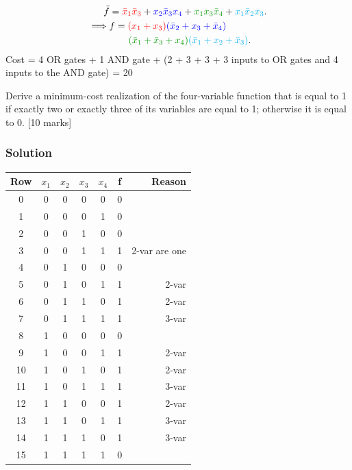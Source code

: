 \\
\begin{align}
  \bar{f} &= { \cred \bx_1 \bx_3 }  +  { \cb  x_2 \bx_3 x_4 }+  {\cg x_1 x_3 \bx_4
  } + { \color{cyan} x_1 \bx_2 x_3}.
  \\
  \implies &f = { \cred (x_1 + x_3) } {\cb (\bx_2 + x_3 + \bx_4) }
  \notag\\
  &\qquad {\cg (\bx_1 + \bx_3 + x_4) }
  {\color{cyan} (\bx_1 + x_2 + \bx_3 )}.
\end{align}
Cost = 4 OR gates + 1 AND gate + (2 + 3 + 3 + 3 inputs to OR gates and 4 inputs
to the AND gate) = 20 



\begin{prob}
Derive a minimum-cost realization of the four-variable function that is equal to 1 if exactly
two or exactly three of its variables are equal to 1; otherwise it is equal to
0. \cite[Prob 2.46]{brown2013fundamentals} [10 marks]
\end{prob}

\subsubsection*{Solution}

\begin{tabular}{c|cccc||c|r}
  \toprule
  Row & $x_1$  & $x_2$ & $x_3$ & $x_4$ & f & Reason\\
  \midrule
   0 & 0 & 0 &  0 & 0 & 0 & 
   \\
   1 & 0 & 0 &  0 & 1 & 0 &
   \\
   2 & 0 & 0 &  1 & 0 & 0 &
   \\
   3 & 0 & 0 &  1 & 1 & 1 & 2-var are one
   \\
   4 & 0 & 1 &  0 & 0 & 0 & 
   \\
   5 & 0 & 1 &  0 & 1 & 1 & 2-var
   \\
   6 & 0 & 1 &  1 & 0 & 1 & 2-var
   \\
   7 & 0 & 1 &  1 & 1 & 1 & 3-var
   \\
   8 & 1 & 0 &  0 & 0 & 0 & 
   \\
   9 & 1 & 0 &  0 & 1 & 1 & 2-var
  \\
  10 & 1 & 0 &  1 & 0 & 1 & 2-var
  \\
  11 & 1 & 0 &  1 & 1 & 1 & 3-var
  \\
  12 & 1 & 1 &  0 & 0 & 1 & 2-var
  \\
  13 & 1 & 1 &  0 & 1 & 1 & 3-var
  \\
  14 & 1 & 1 &  1 & 0 & 1 & 3-var
  \\
  15 & 1 & 1 &  1 & 1 & 0 &
  \\
  \bottomrule
\end{tabular}

